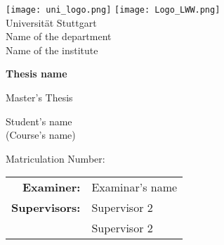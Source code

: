 \begin{titlepage}
	\begin{large}
	\begin{center}
	\texttt{[image: uni\_logo.png]}
	\hspace*{4in}
	\texttt{[image: Logo\_LWW.png]}\\
		Universit{\"a}t Stuttgart\\
		\vspace{1cm}
		Name of the department\\
		Name of the institute\\
		
		\vspace{1.0cm}
		\begin{Huge}
			\textbf{Thesis name}\\
		\end{Huge}
		\vspace{1.5cm}
		Master's Thesis
		
		\vspace{1.5cm}
		Student's name\\
		(Course's name)
		\vspace{1.5cm}
		
		Matriculation Number: \\
		
		\date{\today}
	\end{center}
		\vspace{1.5cm}
		\begin{tabular}{rl}
			\textbf{Examiner:} & Examinar's name \\
			\textbf{Supervisors:} & Supervisor 2 \\ & Supervisor 2
		\end{tabular}
	
	\end{large}
\end{titlepage}
		